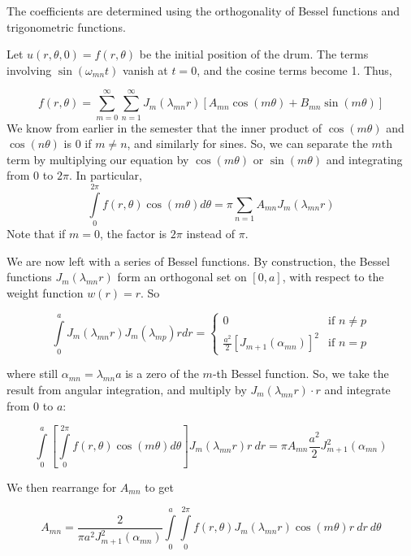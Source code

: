 \documentclass[11pt, letterpaper]{article}
\begin{document}
The coefficients are determined using the orthogonality of Bessel functions and trigonometric functions.

Let $u(r, \theta, 0) = f(r, \theta)$ be the initial position of the drum. The terms involving $\sin(\omega_{mn}t)$ vanish at $t = 0$, and the cosine terms become 1. Thus,

\begin{equation}
f(r, \theta) = \sum\limits_{m=0}^{\infty}\sum\limits_{n=1}^{\infty} J_{m}(\lambda_{mn} r) [A_{mn} \cos(m \theta) + B_{mn} \sin(m \theta)]
\end{equation}
We know from earlier in the semester that the inner product of $\cos(m \theta)$ and $\cos(n \theta)$ is 0 if $m \neq n$, and similarly for sines. So, we can separate the $m$th term by multiplying our equation by $\cos(m \theta)$ or $\sin(m \theta)$ and integrating from $0$ to $2 \pi$. In particular,
\begin{equation}
\int\limits_{0}^{2\pi}{f(r, \theta) \cos(m \theta)d \theta} = \pi \sum\limits_{n=1} A_{mn} J_{m}(\lambda_{mn} r)
\end{equation}
Note that if $m = 0$, the factor is $2 \pi$ instead of $\pi$. 

We are now left with a series of Bessel functions. By construction, the Bessel functions $J_{m}(\lambda_{mn} r)$ form an orthogonal set on $[0, a]$, with respect to the weight function $w(r) = r$. So 

\begin{equation}
\int\limits_{0}^{a}{J_{m}(\lambda_{mn} r) J_{m}(\lambda_{mp}) r dr} = \begin{cases}
0 & \text{if } n \neq p\\
\frac{a^{2}}{2} [J_{m+1}(\alpha_{mn})]^{2} &\text{if } n = p
\end{cases}
\end{equation}

where still $\alpha_{mn} = \lambda_{mn} a$ is a zero of the $m$-th Bessel function. So, we take the result from angular integration, and multiply by $J_{m}(\lambda_{mn} r) \cdot r$ and integrate from $0$ to $a$:

\begin{equation}
\int\limits_{0}^{a} \left[ \int\limits_{0}^{2\pi}{f(r, \theta) \cos(m \theta)d \theta}\right] J_{m} (\lambda_{mn}r)r ~dr = \pi A_{mn} \frac{a^{2}}{2} J_{m+1}^{2} (\alpha_{mn})
\end{equation}

We then rearrange for $A_{mn}$ to get

\begin{equation}
A_{mn} = \frac{2}{\pi a^{2} J_{m+1}^{2} (\alpha_{mn})} \int\limits_{0}^{a} \int\limits_{0}^{2 \pi}{f(r, \theta) J_{m}(\lambda_{mn} r) \cos(m \theta) r ~dr ~d \theta}
\end{equation}
\end{document}
